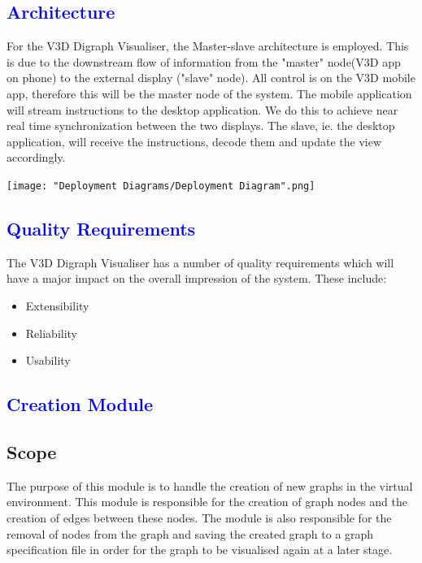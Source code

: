 \documentclass[12pt]{article}
\begin{document}
\newpage
{}
\thispagestyle{empty}
\tableofcontents
\clearpage

\textcolor{blue}{\section{Architecture}}
\begin{flushleft}
For the V3D Digraph Visualiser, the Master-slave architecture is employed. This is due to the downstream flow of information from the "master" node(V3D app on phone) to the external display ("slave" node). \newline
All control is on the V3D mobile app, therefore this will be the master node of the system. The mobile application will stream instructions to the desktop application. 
We do this to achieve near real time synchronization between the two displays. The slave, ie. the desktop application, will receive the instructions, decode them and update the view accordingly.
\end{flushleft}

\texttt{[image: "Deployment Diagrams/Deployment Diagram".png]}

\newpage

\textcolor{blue}{\section{Quality Requirements}}
\begin{flushleft}
The V3D Digraph Visualiser has a number of quality requirements which will have a major impact on the overall impression of the system. These include:
\begin{itemize}
	\item Extensibility
	\item Reliability
	\item Usability
\end{itemize}
\end{flushleft}

\textcolor{blue}{\section{Creation Module}}
\subsection{Scope}
The purpose of this module is to handle the creation of new graphs in the virtual environment. This module is responsible for the creation of graph nodes and the creation of edges between these nodes. The module is also responsible for the removal of nodes from the graph and saving the created graph to a graph specification file in order for the graph to be visualised again at a later stage.
\end{document}
